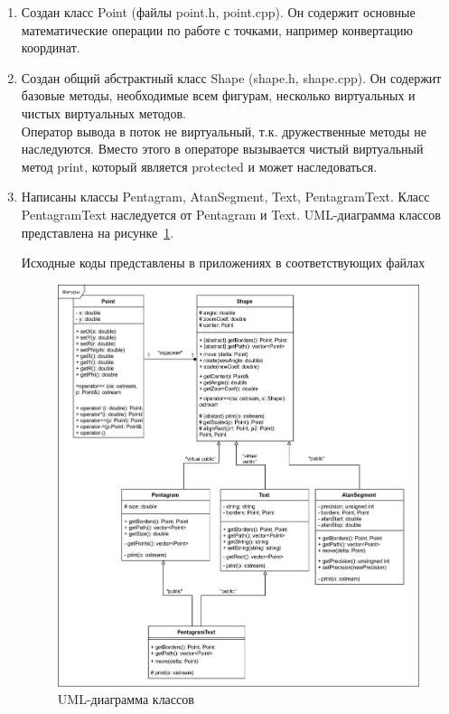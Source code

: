 \documentclass[a4paper, 14pt]{extarticle}
\begin{document}
\begin{enumerate}
    \item Создан класс Point (файлы point.h, point.cpp). Он содержит основные математические операции по работе с точками, например конвертацию координат.
    \item Создан общий абстрактный класс Shape (shape.h, shape.cpp). Он содержит базовые методы, необходимые всем фигурам, несколько виртуальных и чистых виртуальных методов.\\
    Оператор вывода в поток не виртуальный, т.к. дружественные методы не наследуются. Вместо этого в операторе вызывается чистый виртуальный метод print, который является protected и может наследоваться.
    \item Написаны классы Pentagram, AtanSegment, Text, PentagramText. Класс PentagramText наследуется от Pentagram и Text. UML-диаграмма классов представлена на рисунке~\ref{img:uml:shapes}.

    Исходные коды представлены в приложениях в соответствующих файлах
    \begin{figure}[h]
        \centering
        \includegraphics[width=\textwidth]{./img/classes_uml.png}
        \caption{UML-диаграмма классов}%
        \label{img:uml:shapes}
    \end{figure}
\end{enumerate}
\end{document}
